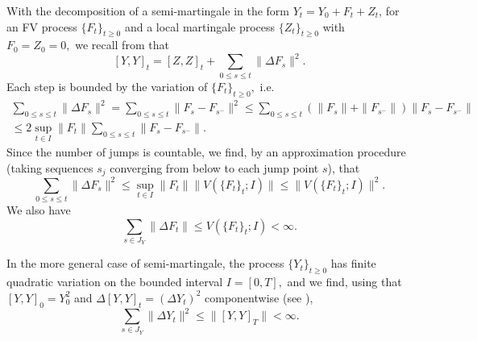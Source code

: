 \documentclass[reqno,12pt]{amsart}
\theoremstyle{plain} %
\theoremstyle{definition} %
\begin{document}
With the decomposition of a semi-martingale in the form $Y_t = Y_0 + F_t + Z_t$, for an FV process $\{F_t\}_{t\geq 0}$ and a local martingale process $\{Z_t\}_{t\geq 0}$ with $F_0 = Z_0 = 0,$ we recall from \cite[Lemma 18.7]{Metivier1982} that
\[
    [Y, Y]_t = [Z, Z]_t + \sum_{0 \leq s \leq t} \|\Delta F_s\|^2.
\]
Each step is bounded by the variation of $\{F_t\}_{t\geq 0},$ i.e.
\begin{multline*}
    \sum_{0 \leq s \leq t} \|\Delta F_s\|^2 = \sum_{0 \leq s \leq t} \|F_s - F_{s^-}\|^2 \leq \sum_{0 \leq s \leq t} (\|F_s\| + \|F_{s^-}\|)\|F_s - F_{s^-}\| \\
    \leq 2\sup_{t\in I} \|F_t\| \sum_{0 \leq s \leq t} \|F_s - F_{s^-}\|.
\end{multline*}
Since the number of jumps is countable, we find, by an approximation procedure (taking sequences $s_j$ converging from below to each jump point $s$), that
\[
    \sum_{0 \leq s \leq t} \|\Delta F_s\|^2 \leq \sup_{t\in I} \|F_t\| \|V(\{F_t\}_t; I)\| \leq \|V(\{F_t\}_t; I)\|^2.
\]
We also have
\begin{equation}
    \label{estimatejumpfv}
    \sum_{s\in J_{Y}} \|\Delta F_t\| \leq V(\{F_t\}_t; I) < \infty.
\end{equation}

In the more general case of semi-martingale, the process $\{Y_t\}_{t\geq 0}$ has finite quadratic variation \cite[Section II.6]{Protter2005} on the bounded interval $I=[0, T],$ and we find, using that $[Y, Y]_0 = Y_0^2$ and $\Delta [Y, Y]_t = (\Delta Y_t)^2$ componentwise (see \cite[Theorem II.22]{Protter2005}),
\begin{equation}
    \label{estimatejumpsemimartingale}
    \sum_{s\in J_{Y}} \|\Delta Y_t\|^2 \leq \|[Y, Y]_T\| < \infty.
\end{equation}
\end{document}

